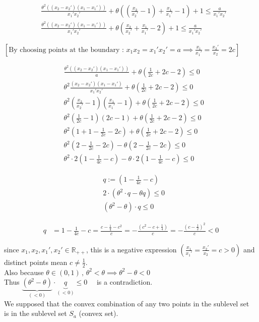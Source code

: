 \documentclass{article}
\begin{document}
\begin{align*}
&\frac{\theta^2 ((x_2 - x_2')(x_1 - x_1'))}{x_1' x_2'} + \theta \left( \left( \frac{x_2}{x_2'} - 1 \right) + \frac{x_1}{x_1'} - 1 \right) + 1 \leq \frac{a}{x_1' x_2'} \\[1em]
&\frac{\theta^2 ((x_2 - x_2')(x_1 - x_1'))}{x_1' x_2'} + \theta \left( \frac{x_2}{x_2'} + \frac{x_1}{x_1'} - 2 \right) + 1 \leq \frac{a}{x_1' x_2'}
\end{align*}

\vspace{1em}

\noindent $\left[ \text{By choosing points at the boundary : } x_1 x_2 = x_1' x_2' = a \implies \frac{x_1}{x_1'} = \frac{x_2'}{x_2} = 2c \right]$

\begin{align*}
&\frac{\theta^2((x_2 - x_2')(x_1 - x_1'))}{a} + \theta \left( \frac{1}{2c} + 2c - 2 \right) \leq 0 \\[1em]
&\theta^2 \frac{(x_2 - x_2')(x_1 - x_1')}{x_1' x_2'} + \theta \left( \frac{1}{2c} + 2c - 2 \right) \leq 0 \\[1em]
&\theta^2 \left( \frac{x_2}{x_2'} - 1 \right) \left( \frac{x_1}{x_1'} - 1 \right) + \theta \left( \frac{1}{2c} + 2c - 2 \right) \leq 0 \\[1em]
&\theta^2 \left( \frac{1}{2c} - 1 \right)(2c - 1) + \theta \left( \frac{1}{2c} + 2c - 2 \right) \leq 0 \\[1em]
&\theta^2 \left( 1 + 1 - \frac{1}{2c} - 2c \right) + \theta \left( \frac{1}{2c} + 2c - 2 \right) \leq 0 \\[1em]
&\theta^2 \left( 2 - \frac{1}{2c} - 2c \right) - \theta \left( 2 - \frac{1}{2c} - 2c \right) \leq 0 \\[1em]
&\theta^2 \cdot 2 \left( 1 - \frac{1}{4c} - c \right) - \theta \cdot 2 \left( 1 - \frac{1}{4c} - c \right) \leq 0
\end{align*}

\begin{align*}
&q := \left( 1 - \frac{1}{4c} - c \right) \\[0.5em]
&2 \cdot (\theta^2 \cdot q - \theta q) \leq 0 \\[0.5em]
&(\theta^2 - \theta) \cdot q \leq 0
\end{align*}

\vspace{1em}
\begin{align*}
q &= 1 - \frac{1}{4c} - c = \frac{c - \frac{1}{4} - c^2}{c} = -\frac{(c^2 - c + \frac{1}{4})}{c} = -\frac{(c - \frac{1}{2})^2}{c} < 0
\end{align*}

since $x_1, x_2, x_1', x_2' \in \mathbb{R}_{++}$, this is a negative expression $\left( \frac{x_1}{x_1'} = \frac{x_2'}{x_2} = c > 0 \right)$ and distinct points mean $c \neq \frac{1}{2}$. \\[1em]
Also because $\theta \in (0,1) \, , \, \theta^2 < \theta \implies \theta^2 - \theta < 0$ \\[1em]
Thus \quad $\underbrace{(\theta^2 - \theta)}_{(<0)} \cdot \underbrace{q}_{(<0)} \leq 0 \quad$ is a contradiction. \\[1em]
We supposed that the convex combination of any two points in the sublevel set \\
is in the sublevel set $S_a$ (convex set). 
\end{document}
